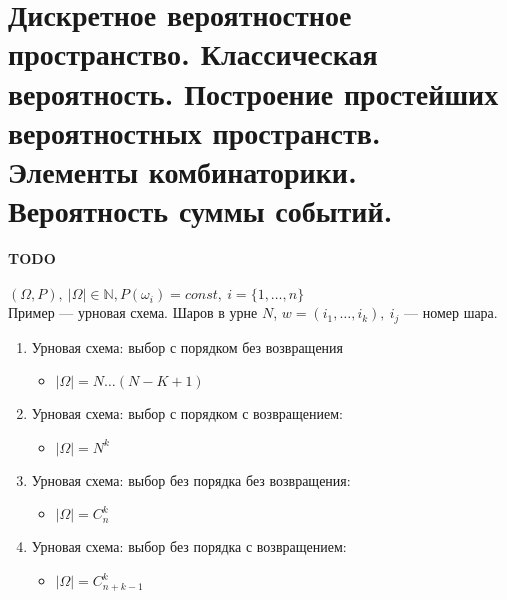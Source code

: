 \documentclass[11pt,a4paper]{report}
\theoremstyle{definition}
\theoremstyle{definition}
\theoremstyle{definition}
\begin{document}
  \section{Дискретное вероятностное пространство. Классическая вероятность. Построение простейших вероятностных пространств. Элементы комбинаторики. Вероятность суммы событий.}
		  \textbf{TODO}\\\\
  		$(\Omega, P),\ |\Omega| \in \mathbb{N}, P(\omega_{i}) = const,\ i = \{1,\dots,n\}$\\
  		Пример — урновая схема. Шаров в урне $N $, $w = (i_{1}, \dots, i_{k}),\ i_{j}$ — номер шара.
   		\begin{enumerate}[1.]
   			\item{Урновая схема: выбор с порядком без возвращения}
   			\begin{itemize}
   				\item{$|\Omega| = N \dots (N - K + 1)$}
   			\end{itemize}
   			\item{Урновая схема: выбор с порядком с возвращением:}
   			\begin{itemize}
   				\item{$|\Omega| = N^{k}$}
   			\end{itemize}
  			\item{Урновая схема: выбор без порядка без возвращения:}
   			\begin{itemize}
   				\item{$|\Omega| = C^{k}_{n}$}
   			\end{itemize}
   			\item{Урновая схема: выбор без порядка с возвращением:}
   			\begin{itemize}
   				\item{$|\Omega| = C^{k}_{n+k-1}$}
   			\end{itemize}
   		\end{enumerate}
\end{document}
